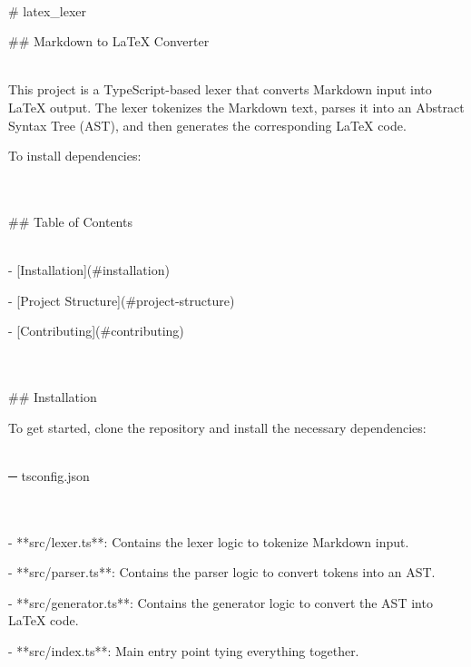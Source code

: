 \\
  \# latex\_lexer


  \#\# Markdown to LaTeX Converter


\\
  This project is a TypeScript-based lexer that converts Markdown input into LaTeX output. The lexer tokenizes the Markdown text, parses it into an Abstract Syntax Tree (AST), and then generates the corresponding LaTeX code.


  To install dependencies:


\\
\\
  \#\# Table of Contents


\\
  - [Installation](\#installation)


  - [Project Structure](\#project-structure)


  - [Contributing](\#contributing)


\\
\\
  \#\# Installation


  To get started, clone the repository and install the necessary dependencies:


\\
─ tsconfig.json


\\
\\
  - **src/lexer.ts**: Contains the lexer logic to tokenize Markdown input.


  - **src/parser.ts**: Contains the parser logic to convert tokens into an AST.


  - **src/generator.ts**: Contains the generator logic to convert the AST into LaTeX code.


  - **src/index.ts**: Main entry point tying everything together.


\\
\\
